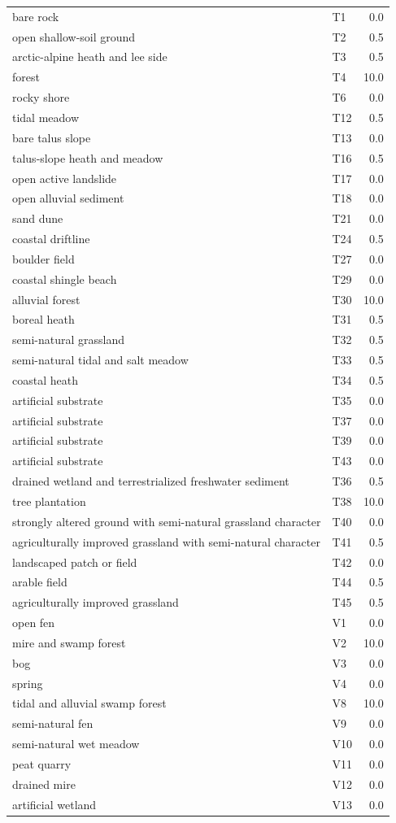 \documentclass[
]{article}
\begin{document}
\begin{longtable}[t]{llr}
\endfoot
\bottomrule
\endlastfoot
bare rock & T1 & 0.0\\
open shallow-soil ground & T2 & 0.5\\
arctic-alpine heath and lee side & T3 & 0.5\\
forest & T4 & 10.0\\
rocky shore & T6 & 0.0\\
\addlinespace
tidal meadow & T12 & 0.5\\
bare talus slope & T13 & 0.0\\
talus-slope heath and meadow & T16 & 0.5\\
open active landslide & T17 & 0.0\\
open alluvial sediment & T18 & 0.0\\
\addlinespace
sand dune & T21 & 0.0\\
coastal driftline & T24 & 0.5\\
boulder field & T27 & 0.0\\
coastal shingle beach & T29 & 0.0\\
alluvial forest & T30 & 10.0\\
\addlinespace
boreal heath & T31 & 0.5\\
semi-natural grassland & T32 & 0.5\\
semi-natural tidal and salt meadow & T33 & 0.5\\
coastal heath & T34 & 0.5\\
artificial substrate & T35 & 0.0\\
\addlinespace
artificial substrate & T37 & 0.0\\
artificial substrate & T39 & 0.0\\
artificial substrate & T43 & 0.0\\
drained wetland and terrestrialized freshwater sediment & T36 & 0.5\\
tree plantation & T38 & 10.0\\
\addlinespace
strongly altered ground with semi-natural grassland character & T40 & 0.0\\
agriculturally improved grassland with semi-natural character & T41 & 0.5\\
landscaped patch or field & T42 & 0.0\\
arable field & T44 & 0.5\\
agriculturally improved grassland & T45 & 0.5\\
\addlinespace
open fen & V1 & 0.0\\
mire and swamp forest & V2 & 10.0\\
bog & V3 & 0.0\\
spring & V4 & 0.0\\
tidal and alluvial swamp forest & V8 & 10.0\\
\addlinespace
semi-natural fen & V9 & 0.0\\
semi-natural wet meadow & V10 & 0.0\\
peat quarry & V11 & 0.0\\
drained mire & V12 & 0.0\\
artificial wetland & V13 & 0.0\\*
\end{longtable}
\end{document}

